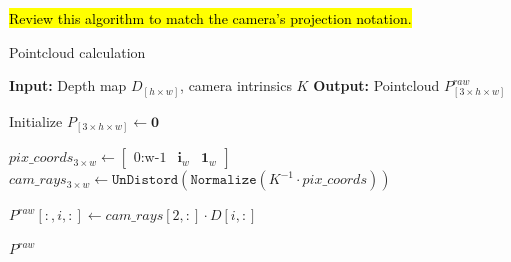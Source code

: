 \hl{Review this algorithm to match the camera's projection notation.}
\begin{algorithm}
    \caption{Pointcloud calculation}
    \label{algorithm:scene_pcd_hloop}
    \footnotesize

    \begin{algorithmic}[1]
        \State \textbf{Input:} Depth map $D_{\left[h \times w\right]}$, camera intrinsics $K$ 
        \State \textbf{Output:} Pointcloud $P^{raw}_{\left[3 \times h \times w\right]}$
        
        \State Initialize $P_{\left[3 \times h \times w\right]} \gets \mathbf{0}$

            \State $pix\_coords_{3 \times w} \gets \begin{bmatrix} \text{0:w-1} & \mathbf{i}_w & \mathbf{1}_w \end{bmatrix}$
            \State $cam\_rays_{3 \times w} \gets \texttt{UnDistord} \left( \texttt{Normalize} \left( K^{-1} \cdot pix\_coords \right)\right)$
            
            \State $P^{raw}[:, i, :] \gets cam\_rays[2, :] \cdot D[i, :]$  
        \EndFor
        
        \State \Return $P^{raw}$
    \end{algorithmic}
\end{algorithm}
